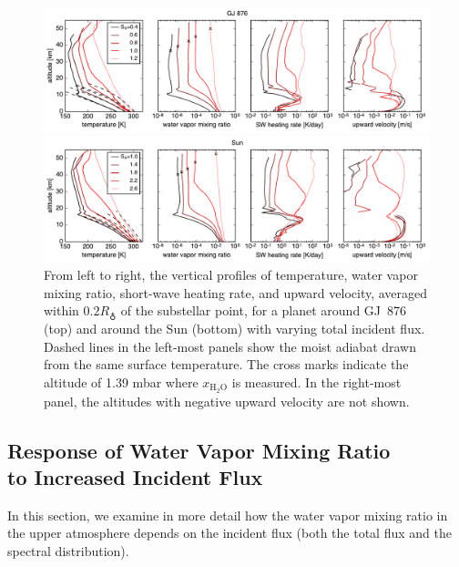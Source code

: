 \documentclass[11pt,numberedappendix,twocolappendix,]{emulateapj}
\def\water{H$_2$O}
\def\xwater{$x_\text{\water}$}
\def\preslevel{1.39 mbar}
\def\wv{water vapor}
\begin{document}
\begin{figure}[tbh]
    \begin{center}
    \includegraphics[width=0.9\hsize]{AqOH0TLS_GJ876_temp_xH2O_vz_heat_ver2.pdf}
    \end{center}
    \begin{center}
        \includegraphics[width=0.9\hsize]{AqOH0TLS_Sun_temp_xH2O_vz_heat_ver3.pdf}
    \end{center}
\caption{From left to right, the vertical profiles of temperature, \wv{} mixing ratio, short-wave heating rate, and upward velocity, averaged within $0.2R_\earth$ of the substellar point, for a planet around GJ~876 (top) and around the Sun (bottom) with varying total incident flux. Dashed lines in the left-most panels show the moist adiabat drawn from the same surface temperature. The cross marks indicate the altitude of \preslevel{} where \xwater{} is measured. In the right-most panel, the altitudes with negative upward velocity are not shown. }
\label{fig:AqOH0TLS_GJ876_temp_xH2O_vz_heat}
\end{figure}


\subsection{Response of Water Vapor Mixing Ratio \\to Increased Incident Flux}
\label{ss:result_H2Omixingratio}


In this section, we examine in more detail how the \wv{} mixing ratio in the upper atmosphere depends on the incident flux (both the total flux and the spectral distribution). 
\end{document}
